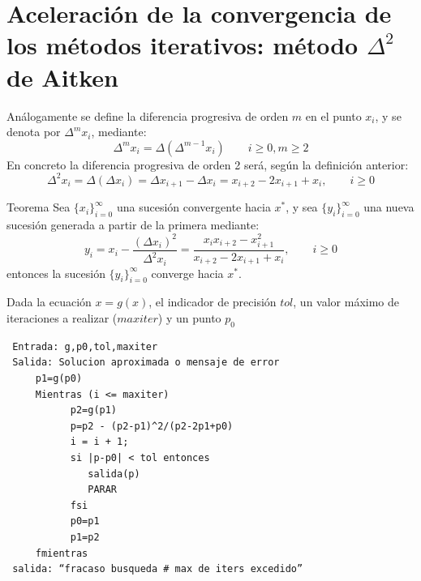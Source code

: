 \documentclass{beamer}
\begin{document}
\section{Aceleraci\'on de la convergencia de los m\'etodos iterativos: m\'etodo $\Delta^2$ de Aitken}
\frame
{
An\'alogamente se define la diferencia progresiva de orden $m$ en el punto $x_i$, y se denota por $\Delta^m x_i$, mediante:
$$
\Delta^m x_i = \Delta(\Delta^{m-1} x_i) \qquad i\geq0,m\geq2
$$
En concreto la diferencia progresiva de orden 2 ser\'a, seg\'un la definici\'on anterior:
$$
\Delta^2 x_i = \Delta(\Delta x_i) = \Delta x_{i+1} - \Delta x_i = x_{i+2} -2x_{i+1} +x_i, \qquad i\geq 0
$$
\begin{block}{Teorema}
 Sea $\{x_i\}_{i=0}^{\infty}$ una sucesi\'on convergente hacia $x^*$, y sea $\{y_i\}_{i=0}^{\infty}$ una nueva sucesi\'on generada a partir de la primera mediante:
$$
y_i = x_i - \frac{(\Delta x_i)^2}{\Delta^2x_i} = \frac{x_ix_{i+2}-x_{i+1}^2}{x_{i+2} -2x_{i+1} +x_i}, \qquad i\geq0
$$
entonces la sucesi\'on $\{y_i\}_{i=0}^\infty$ converge hacia $x^*$. 
\end{block}
}

\begin{frame}[fragile]
Dada la ecuaci\'on $x = g(x)$, el indicador de precisi\'on $tol$, un valor m\'aximo de iteraciones a realizar ($maxiter$) y un punto $p_0$ 
\small
\begin{verbatim}
 Entrada: g,p0,tol,maxiter
 Salida: Solucion aproximada o mensaje de error
     p1=g(p0)
     Mientras (i <= maxiter)
           p2=g(p1)
           p=p2 - (p2-p1)^2/(p2-2p1+p0)           
           i = i + 1;
           si |p-p0| < tol entonces
              salida(p)
              PARAR
           fsi
           p0=p1
           p1=p2
     fmientras
 salida: “fracaso busqueda # max de iters excedido”
\end{verbatim}
\end{frame}
\end{document}
